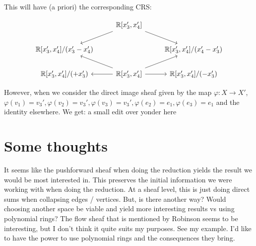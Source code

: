 \documentclass[12pt]{article}
\theoremstyle{definition}
\newcommand{\<}{\langle}
\renewcommand{\>}{\rangle}
\begin{document}
This will have (a priori) the corresponding CRS:

\[\begin{tikzcd}
	& {\mathbb{R}[x_3',x_4']} \\
	{\mathbb{R}[x_3',x_4'] / (x_3' - x_4')} && {\mathbb{R}[x_3',x_4'] / (x_4' - x_3')} \\
	{\mathbb{R}[x_3',x_4'] /(+x_3')} & {\mathbb{R}[x_3',x_4']} & {\mathbb{R}[x_3',x_4'] / (-x_3')}
	\arrow[from=1-2, to=2-1]
	\arrow[from=1-2, to=2-3]
	\arrow[from=3-2, to=2-1]
	\arrow[from=3-2, to=2-3]
	\arrow[from=3-2, to=3-1]
	\arrow[from=3-2, to=3-3]
\end{tikzcd}\]

However, when we consider the direct image sheaf given by the map 
$\varphi: X \to X'$, $\varphi(v_1) = v_3', \varphi(v_2) = v_3', \varphi(v_3) = v_3', \varphi(e_2) = e_1 , \varphi(e_3) = e_1$ and
the identity elsewhere. We get: a small edit over yonder here


\section{Some thoughts}

It seems like the pushforward sheaf when doing the reduction yields the result we would be most
interested in. This preserves the initial information we were working with when doing the reduction.
At a sheaf level, this is just doing direct sums when collapsing edges / vertices. But, is there
another way? Would choosing another space be viable and yield more interesting results vs using
polynomial rings? The flow sheaf that is mentioned by Robinson seems to be interesting, but I don't
think it quite suits my purposes. See my example. I'd like to have the power to use polynomial rings
and the consequences they bring. 
\end{document}
